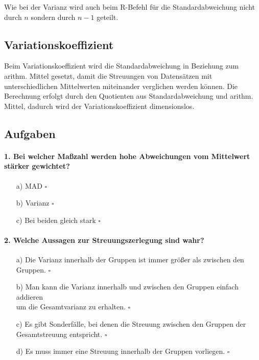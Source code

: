 \documentclass[a4paper]{article}
\newcommand\dangersign[1][2ex]{%
  \renewcommand\stacktype{L}%
  \scaleto{\stackon[1.3pt]{\color{red}$\triangle$}{\tiny !}}{#1}%
}
\begin{document}
\noindent \dangersign[3ex] Wie bei der Varianz wird auch beim R-Befehl für die Standardabweichung nicht durch $n$ sondern durch $n-1$ geteilt.

\subsection{Variationskoeffizient}
Beim Variationskoeffizient wird die Standardabweichung in Beziehung zum arithm. Mittel gesetzt, damit die Streuungen von Datensätzen mit unterschiedlichen Mittelwerten miteinander verglichen werden können. Die Berechnung erfolgt durch den Quotienten aus Standardabweichung und arithm. Mittel, dadurch wird der Variationskoeffizient dimensionslos. \\

\noindent {}

\clearpage

\subsection{Aufgaben}

\paragraph{1. Bei welcher Maßzahl werden hohe Abweichungen vom Mittelwert stärker gewichtet?}

\begin{itemize}
    \item[a)] MAD \hfill $\square$
    \item[b)] Varianz   \hfill $\square$
    \item[c)] Bei beiden gleich stark \hfill $\square$
\end{itemize}

\paragraph{2. Welche Aussagen zur Streuungszerlegung sind wahr?}

\begin{itemize}
    \item[a)] Die Varianz innerhalb der Gruppen ist immer größer als zwischen den Gruppen. \hfill $\square$
    \item[b)] Man kann die Varianz innerhalb und zwischen den Gruppen einfach addieren\\um die Gesamtvarianz zu erhalten. \hfill $\square$
    \item[c)] Es gibt Sonderfälle, bei denen die Streuung zwischen den Gruppen der\\Gesamtstreuung entspricht. \hfill $\square$
    \item[d)] Es muss immer eine Streuung innerhalb der Gruppen vorliegen. \hfill $\square$
\end{itemize}
\end{document}
